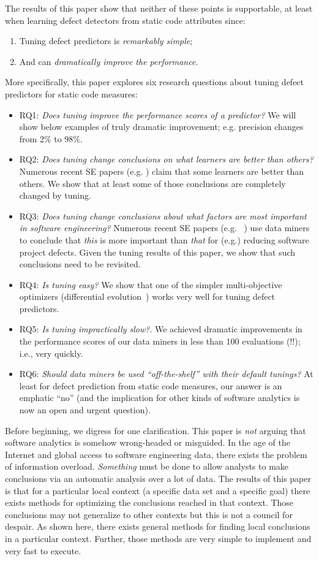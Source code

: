 \documentclass{sig-alternative}
\newcommand{\bi}{\begin{itemize}[leftmargin=0.4cm]}
\newcommand{\ei}{\end{itemize}}
\newcommand{\be}{\begin{enumerate}}
\newcommand{\ee}{\end{enumerate}}
\begin{document}
The results of this paper show that neither of these points is supportable, at least when learning
defect detectors from static code attributes since:
\be
\item
Tuning  defect predictors is {\em remarkably simple};
\item
And can {\em dramatically improve the performance}. 
\ee
More specifically,
this paper explores six research questions about tuning defect predictors for
static code measures:
\bi
\item RQ1: {\em Does   tuning    improve the performance scores of a predictor?} We will show below
 examples of truly dramatic improvement;
e.g.  precision changes from 2\% to 98\%.
\item RQ2: {\em Does tuning change conclusions on what learners are better than others?} 
Numerous recent SE papers (e.g. \cite{lessmann2008benchmarking,hall11,me07b}) claim that some learners are better than others. We show that at least
some of those conclusions are completely changed by tuning.
\item RQ3: {\em Does tuning change conclusions about what factors are most important in software engineering?} Numerous recent SE papers (e.g. ~\cite{bell2013limited,rahman2013how,me02k,moser2008comparative,zimmermann2007predicting,%
herzig2013predicting}) use data miners to conclude that {\em this}
is more important than {\em that} for (e.g.) reducing software project defects.
Given the  tuning results of this paper, we show that such conclusions need to be revisited.
\item  RQ4: {\em Is tuning easy?} We show that one of the simpler multi-objective optimizers
(differential evolution~\cite{storn1997differential}) works very well for tuning defect predictors. 
\item RQ5: {\em Is tuning impractically slow?}. We achieved dramatic improvements in the performance scores
of our data miners in less than 100 evaluations (!!); i.e., very
quickly.
\item RQ6: {\em Should data miners be used ``off-the-shelf'' with their default tunings?} 
At least for defect prediction from static code measures, our answer is an emphatic ``no'' (and
the implication for other kinds of software analytics is now an open and urgent question).
\ei
Before beginning, we digress for one  clarification.
This paper is {\em not} arguing that
software analytics is somehow wrong-headed or misguided.
In the age of the Internet and global access to software engineering data,
there exists the  problem of information overload. {\em Something} must be done to
allow analysts to make conclusions via an automatic analysis over a lot of data.
The results of this paper is that for a particular local context
(a specific data set and a specific goal) there exists  
methods for optimizing the conclusions reached in that context.  
Those conclusions
may not generalize to other contexts but this  is not a council for despair. 
As shown here, 
there  exists general methods for finding
local conclusions in a particular context. Further,
those
methods are  very simple to implement and very fast to execute.
\end{document}
